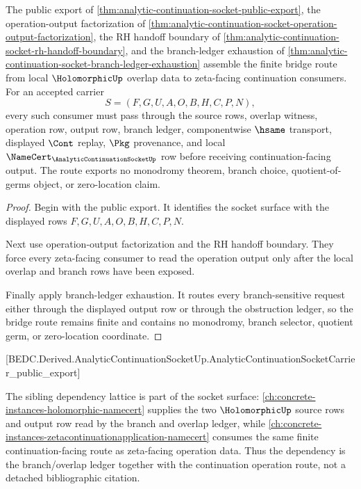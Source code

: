 \begin{theorem}
\label{thm:analytic-continuation-socket-bridge-route}
The public export of \autoref{thm:analytic-continuation-socket-public-export}, the operation-output factorization of \autoref{thm:analytic-continuation-socket-operation-output-factorization}, the RH handoff boundary of \autoref{thm:analytic-continuation-socket-rh-handoff-boundary}, and the branch-ledger exhaustion of \autoref{thm:analytic-continuation-socket-branch-ledger-exhaustion} assemble the finite bridge route from local $\HolomorphicUp$ overlap data to zeta-facing continuation consumers. For an accepted carrier
$$
S=(F,G,U,A,O,B,H,C,P,N),
$$
every such consumer must pass through the source rows, overlap witness, operation row, output row, branch ledger, componentwise $\hsame$ transport, displayed $\Cont$ replay, $\Pkg$ provenance, and local $\NameCert_{\AnalyticContinuationSocketUp}$ row before receiving continuation-facing output. The route exports no monodromy theorem, branch choice, quotient-of-germs object, or zero-location claim.
\end{theorem}
\begin{proof}
Begin with the public export. It identifies the socket surface with the displayed rows $F,G,U,A,O,B,H,C,P,N$.

Next use operation-output factorization and the RH handoff boundary. They force every zeta-facing consumer to read the operation output only after the local overlap and branch rows have been exposed.

Finally apply branch-ledger exhaustion. It routes every branch-sensitive request either through the displayed output row or through the obstruction ledger, so the bridge route remains finite and contains no monodromy, branch selector, quotient germ, or zero-location coordinate.
\end{proof}

[BEDC.Derived.AnalyticContinuationSocketUp.AnalyticContinuationSocketCarrier\_public\_export]

The sibling dependency lattice is part of the socket surface: \autoref{ch:concrete-instances-holomorphic-namecert} supplies the two $\HolomorphicUp$ source rows and output row read by the branch and overlap ledger, while \autoref{ch:concrete-instances-zetacontinuationapplication-namecert} consumes the same finite continuation-facing route as zeta-facing operation data. Thus the dependency is the branch/overlap ledger together with the continuation operation route, not a detached bibliographic citation.

